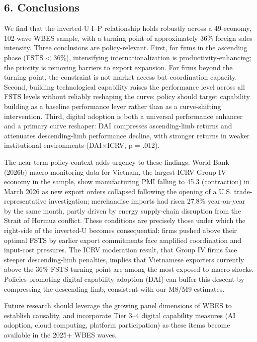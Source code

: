 \documentclass[12pt,a4paper]{article}
\begin{document}
\hypertarget{6-conclusions}{%
\subsection{6. Conclusions}\label{6-conclusions}}

We find that the inverted-U I--P relationship holds robustly across a
49-economy, 102-wave WBES sample, with a turning point of approximately
36\% foreign sales intensity. Three conclusions are policy-relevant.
First, for firms in the ascending phase (FSTS \textless{} 36\%),
intensifying internationalization is productivity-enhancing; the
priority is removing barriers to export expansion. For firms beyond the
turning point, the constraint is not market access but coordination
capacity. Second, building technological capability raises the
performance level across all FSTS levels without reliably reshaping the
curve; policy should target capability building as a baseline
performance lever rather than as a curve-shifting intervention. Third,
digital adoption is both a universal performance enhancer and a primary
curve reshaper: DAI compresses ascending-limb returns and attenuates
descending-limb performance decline, with stronger returns in weaker
institutional environments (DAI×ICRV, p = .012).

The near-term policy context adds urgency to these findings. World Bank
(2026b) macro monitoring data for Vietnam, the largest ICRV Group IV
economy in the sample, show manufacturing PMI falling to 45.3
(contraction) in March 2026 as new export orders collapsed following the
opening of a U.S. trade-representative investigation; merchandise
imports had risen 27.8\% year-on-year by the same month, partly driven
by energy supply-chain disruption from the Strait of Hormuz conflict.
These conditions are precisely those under which the right-side of the
inverted-U becomes consequential: firms pushed above their optimal FSTS
by earlier export commitments face amplified coordination and input-cost
pressures. The ICRV moderation result, that Group IV firms face steeper
descending-limb penalties, implies that Vietnamese exporters currently
above the 36\% FSTS turning point are among the most exposed to macro
shocks. Policies promoting digital capability adoption (DAI) can buffer
this descent by compressing the descending limb, consistent with our
M8/M9 estimates.

Future research should leverage the growing panel dimensions of WBES to
establish causality, and incorporate Tier 3--4 digital capability
measures (AI adoption, cloud computing, platform participation) as these
items become available in the 2025+ WBES waves.
\end{document}
